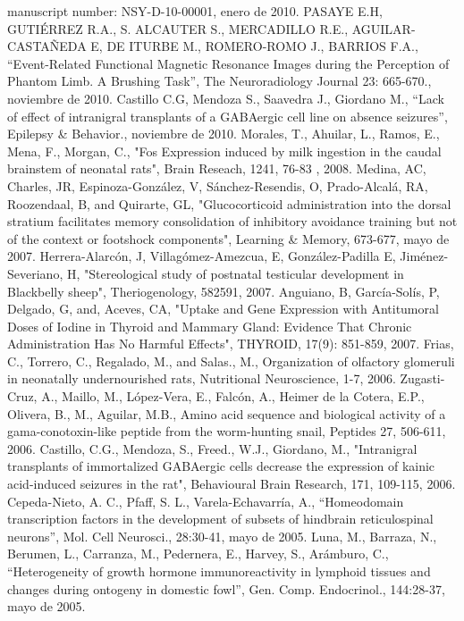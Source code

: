 manuscript number: NSY-D-10-00001,  enero de 2010.
PASAYE E.H, GUTIÉRREZ R.A., S. ALCAUTER S., MERCADILLO R.E., AGUILAR-CASTAÑEDA E, DE ITURBE M., ROMERO-ROMO J., BARRIOS F.A., “Event-Related Functional 
Magnetic Resonance Images during the Perception of Phantom Limb. A Brushing Task”, The Neuroradiology Journal 23: 665-670.,  noviembre de 2010.
Castillo C.G, Mendoza S., Saavedra J., Giordano M., “Lack of effect of intranigral transplants of a GABAergic cell line on absence seizures”, Epilepsy & 
Behavior.,  noviembre de 2010.
Morales, T., Ahuilar, L., Ramos, E., Mena, F., Morgan, C., "Fos Expression induced by milk ingestion in the caudal brainstem of neonatal rats", Brain 
Reseach, 1241, 76-83 ,  2008.
Medina, AC, Charles, JR, Espinoza-González, V, Sánchez-Resendis, O, Prado-Alcalá, RA, Roozendaal, B, and Quirarte, GL, "Glucocorticoid administration into 
the dorsal stratium facilitates memory consolidation of inhibitory avoidance training but not of the context or footshock components", Learning & Memory, 
673-677,  mayo de 2007.
Herrera-Alarcón, J, Villagómez-Amezcua, E, González-Padilla E, Jiménez-Severiano, H, "Stereological study of postnatal testicular development in Blackbelly 
sheep", Theriogenology, 582591,  2007.
Anguiano, B, García-Solís, P, Delgado, G, and, Aceves, CA, "Uptake and Gene Expression with Antitumoral Doses of Iodine in Thyroid and Mammary Gland: 
Evidence That Chronic Administration Has No Harmful Effects", THYROID, 17(9): 851-859,  2007.
Frias, C., Torrero, C., Regalado, M., and Salas., M., Organization of olfactory glomeruli in neonatally undernourished rats, Nutritional Neuroscience, 1-7,  
2006.
Zugasti-Cruz, A., Maillo, M., López-Vera, E., Falcón, A., Heimer de la Cotera, E.P., Olivera, B., M., Aguilar, M.B., Amino acid sequence and biological 
activity of a gama-conotoxin-like peptide from the worm-hunting snail, Peptides 27, 506-611,  2006.
Castillo, C.G., Mendoza, S., Freed., W.J., Giordano, M., "Intranigral transplants of immortalized GABAergic cells decrease the expression of kainic 
acid-induced seizures in the rat", Behavioural Brain Research, 171, 109-115,  2006.
Cepeda-Nieto, A. C., Pfaff, S. L., Varela-Echavarría, A., “Homeodomain transcription factors in the development of subsets of hindbrain reticulospinal 
neurons”, Mol. Cell Neurosci., 28:30-41,  mayo de 2005.
Luna, M., Barraza, N., Berumen, L., Carranza, M., Pedernera, E., Harvey, S., Arámburo, C., “Heterogeneity of growth hormone immunoreactivity in lymphoid 
tissues and changes during ontogeny in domestic fowl”, Gen. Comp. Endocrinol., 144:28-37,  mayo de 2005.
